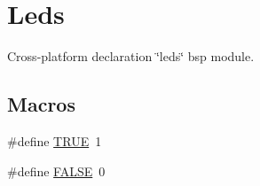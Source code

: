 \hypertarget{group__leds}{}\section{Leds}
\label{group__leds}


Cross-\/platform declaration \char`\"{}leds\char`\"{} bsp module.  


\subsection*{Macros}
\begin{DoxyCompactItemize}
\item 
\#define \hyperlink{group__leds_gaa8cecfc5c5c054d2875c03e77b7be15d}{T\+R\+UE}~1
\item 
\#define \hyperlink{group__leds_gaa93f0eb578d23995850d61f7d61c55c1}{F\+A\+L\+SE}~0
\end{DoxyCompactItemize}
